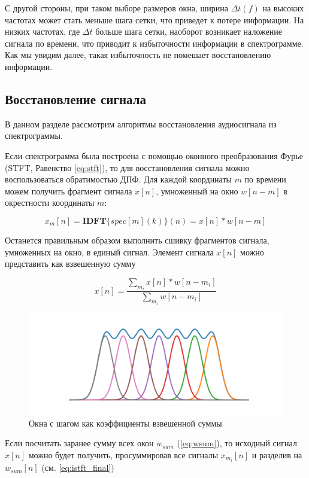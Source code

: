 С другой стороны, при таком выборе размеров окна, ширина $\Delta t(f)$ на высоких частотах может стать меньше шага сетки, что приведет к потере информации.
На низких частотах, где $\Delta t$ больше шага сетки, наоборот возникает наложение сигнала по времени, что приводит к избыточности информации в спектрограмме. 
Как мы увидим далее, такая избыточность не помешает восстановлению информации.


\subsection{Восстановление сигнала}
В данном разделе рассмотрим алгоритмы восстановления аудиосигнала из спектрограммы.

Если спектрограмма была построена с помощью оконного преобразования Фурье (STFT, Равенство \ref{eq:stft}), то для восстановления сигнала можно воспользоваться обратимостью ДПФ.
Для каждой координаты $m$ по времени можем получить фрагмент сигнала $x[n]$, умноженный на окно $w[n-m]$ в окрестности координаты $m$: 

\begin{equation}
  x_m[n] = \textbf{IDFT}\{spec[m](k)\}(n) = x[n]*w[n - m]
  \label{eq:idft}
\end{equation}

Останется правильным образом выполнить сшивку фрагментов сигнала, умноженных на окно, в единый сигнал.
Элемент сигнала $x[n]$ можно представить как взвешенную сумму

\begin{equation}
  x[n] = \frac{\sum_{m_i} x[n]*w[n-m_i]}{\sum_{m_i} w[n-m_i]}
  \label{eq:weighted_sum_stft}
\end{equation}

\begin{figure}
  \centering
  \includegraphics[width=0.8\linewidth]{figures/windows_sum}
  \caption{Окна с шагом как коэффициенты взвешенной суммы}
  \label{fig:windows_sum}
\end{figure}

Если посчитать заранее сумму всех окон $w_{sum}$ (\ref{eq:wsum}), то исходный сигнал $x[n]$ можно будет получить, 
просуммировав все сигналы $x_{m_i}[n]$ и разделив на $w_{sum}[n]$ (см. \ref{eq:istft_final})

